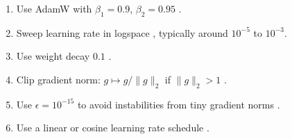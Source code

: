 \begin{enumerate}
    \item Use AdamW with $\beta_1 = 0.9$, $\beta_2 = 0.95$ \citep{modded_nanogpt_2024,kumar2024scaling}.
    \item Sweep learning rate in logspace \citep{bengio2012practicalrecommendationsgradientbasedtraining}, typically around $10^{-5}$ to $10^{-3}$.
    \item Use weight decay $0.1$ \citep{brown2020languagemodelsfewshotlearners,ahmadian2023,deepseekai2025deepseekv3technicalreport}.
    \item Clip gradient norm: $g \mapsto g / \|g\|_2$ if $\|g\|_2 > 1$ \citep{kumar2024scaling,deepseekai2025deepseekv3technicalreport}.
    \item Use $\epsilon = 10^{-15}$ to avoid instabilities from tiny gradient norms \citep{wortsman2023smallscaleproxieslargescaletransformer}.
    \item Use a linear or cosine learning rate schedule \citep{bengio2012practicalrecommendationsgradientbasedtraining,modded_nanogpt_2024}.
\end{enumerate}



